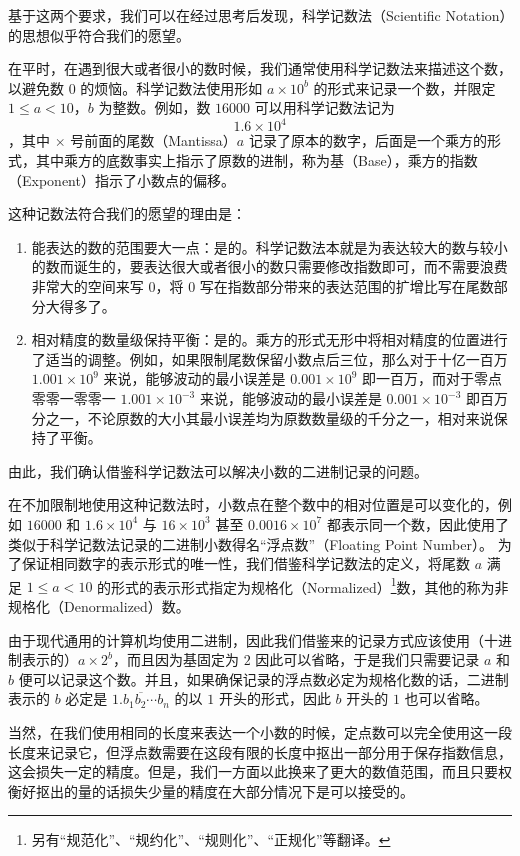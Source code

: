         基于这两个要求，我们可以在经过思考后发现，科学记数法（Scientific Notation）的思想似乎符合我们的愿望。

        在平时，在遇到很大或者很小的数时候，我们通常使用科学记数法来描述这个数，以避免数 $0$ 的烦恼。科学记数法使用形如 $a \times 10^b$ 的形式来记录一个数，并限定 $1 \leqslant a < 10 $，$b$ 为整数。例如，数 $16000$ 可以用科学记数法记为
        \[1.6 \times 10^4\]
        ，其中 $\times$ 号前面的尾数（Mantissa）$a$ 记录了原本的数字，后面是一个乘方的形式，其中乘方的底数事实上指示了原数的进制，称为基（Base），乘方的指数（Exponent）指示了小数点的偏移。

        这种记数法符合我们的愿望的理由是：
        \begin{enumerate}
            \item 能表达的数的范围要大一点：是的。科学记数法本就是为表达较大的数与较小的数而诞生的，要表达很大或者很小的数只需要修改指数即可，而不需要浪费非常大的空间来写 $0$，将 $0$ 写在指数部分带来的表达范围的扩增比写在尾数部分大得多了。
            \item 相对精度的数量级保持平衡：是的。乘方的形式无形中将相对精度的位置进行了适当的调整。例如，如果限制尾数保留小数点后三位，那么对于十亿一百万 $1.001 \times 10^9$ 来说，能够波动的最小误差是 $0.001 \times 10^9$ 即一百万，而对于零点零零一零零一 $1.001 \times 10^{-3}$ 来说，能够波动的最小误差是 $0.001 \times 10^{-3}$ 即百万分之一，不论原数的大小其最小误差均为原数数量级的千分之一，相对来说保持了平衡。
        \end{enumerate}

        由此，我们确认借鉴科学记数法可以解决小数的二进制记录的问题。

        在不加限制地使用这种记数法时，小数点在整个数中的相对位置是可以变化的，例如 $16000$ 和 $1.6 \times 10^4$ 与 $16 \times 10^3$ 甚至 $0.0016 \times 10^7$ 都表示同一个数，因此使用了类似于科学记数法记录的二进制小数得名“浮点数”（Floating Point Number）。
        为了保证相同数字的表示形式的唯一性，我们借鉴科学记数法的定义，将尾数 $a$ 满足 $1 \leqslant a < 10$ 的形式的表示形式指定为规格化（Normalized）\footnote{另有“规范化”、“规约化”、“规则化”、“正规化”等翻译。}数，其他的称为非规格化（Denormalized）数。

        由于现代通用的计算机均使用二进制，因此我们借鉴来的记录方式应该使用（十进制表示的）$a \times 2^b$，而且因为基固定为 $2$ 因此可以省略，于是我们只需要记录 $a$ 和 $b$ 便可以记录这个数。并且，如果确保记录的浮点数必定为规格化数的话，二进制表示的 $b$ 必定是 $\overline{1.b_1b_2 \cdots b_n}$ 的以 $1$ 开头的形式，因此 $b$ 开头的 $1$ 也可以省略。

        当然，在我们使用相同的长度来表达一个小数的时候，定点数可以完全使用这一段长度来记录它，但浮点数需要在这段有限的长度中抠出一部分用于保存指数信息，这会损失一定的精度。但是，我们一方面以此换来了更大的数值范围，而且只要权衡好抠出的量的话损失少量的精度在大部分情况下是可以接受的。
